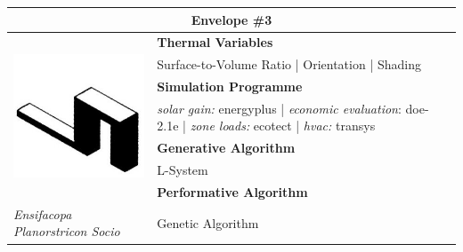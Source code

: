 \begin{table}
	\begin{tabular}{ | m{6cm} | m{14cm} |}
	\toprule
	\multicolumn{2}{c}{Envelope \#{}3} \\[1cm] \hline
	\multirow{7}{*}{\includegraphics[width=5.5cm]{./Images/12-Envelope3}} & \textbf{Thermal Variables} \\[1cm]
		& Surface-to-Volume Ratio | Orientation | Shading\vspace{0.5cm}\\ \cline{2-2}
	 	& \textbf{Simulation Programme} \\[1cm]
	 	& \emph{solar gain:} energyplus | \emph{economic evaluation}: doe-2.1e | \emph{zone loads:} ecotect | \emph{hvac:} transys \vspace{0.5cm}\\ \cline{2-2}
	 	& \textbf{Generative Algorithm} \\[1cm]
	 	& L-System\vspace{0.5cm}\\ \cline{2-2}
	 	& \textbf{Performative Algorithm} \\[1cm]
	 	\emph{Ensifacopa Planorstricon Socio} &  Genetic Algorithm\vspace{0.5cm}\\
\bottomrule
\end{tabular}
\end{table}

\clearpage


